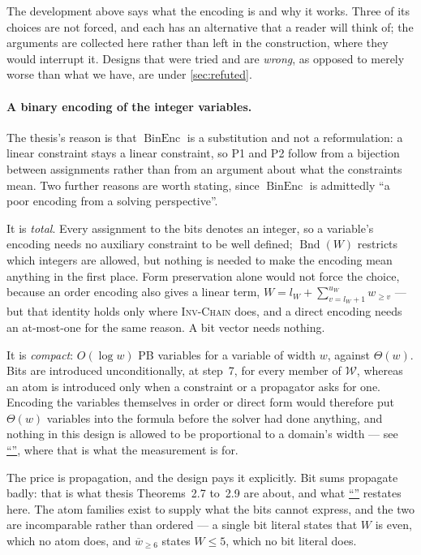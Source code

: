 \documentclass[11pt,a4paper]{article}
\theoremstyle{plain}
\theoremstyle{definition}
\theoremstyle{remark}
\newcommand{\fname}[1]{\ensuremath{\operatorname{#1}}}
\newcommand{\BinEnc}{\fname{BinEnc}}
\newcommand{\Bnd}{\fname{Bnd}}
\newcommand{\atge}[2]{#1_{\geq #2}}
\newcommand{\natge}[2]{\overline{#1}_{\geq #2}}
\newcommand{\inv}[1]{\textnormal{\textsc{Inv-#1}}}
\newcommand{\nsec}[1]{\hyperref[#1]{``\nameref*{#1}''}}
\newcommand{\invChain}{\inv{Chain}}
\begin{document}
The development above says what the encoding is and why it works.  Three of its
choices are not forced, and each has an alternative that a reader will think of;
the arguments are collected here rather than left in the construction, where they
would interrupt it.  Designs that were tried and are \emph{wrong}, as opposed to
merely worse than what we have, are under \cref{sec:refuted}.

\paragraph{A binary encoding of the integer variables.}
The thesis's reason is that $\BinEnc$ is a substitution and not a reformulation:
a linear constraint stays a linear constraint, so P1 and P2 follow from a
bijection between assignments rather than from an argument about what the
constraints mean.  Two further reasons are worth stating, since $\BinEnc$ is
admittedly ``a poor encoding from a solving perspective''.

It is \emph{total}.  Every assignment to the bits denotes an integer, so a
variable's encoding needs no auxiliary constraint to be well defined; $\Bnd(W)$
restricts which integers are allowed, but nothing is needed to make the encoding
mean anything in the first place.  Form preservation alone would not force the
choice, because an order encoding also gives a linear term,
$W = l_W + \sum_{v=l_W+1}^{u_W}\atge{w}{v}$ --- but that identity holds only
where \invChain{} does, and a direct encoding needs an at-most-one for the same
reason.  A bit vector needs nothing.

It is \emph{compact}: $O(\log w)$ PB variables for a variable of width $w$,
against $\Theta(w)$.  Bits are introduced unconditionally, at step~7, for every
member of $\mathcal W$, whereas an atom is introduced only when a constraint or a
propagator asks for one.  Encoding the variables themselves in order or direct
form would therefore put $\Theta(w)$ variables into the formula before the solver
had done anything, and nothing in this design is allowed to be proportional to a
domain's width --- see \nsec{sec:cost}, where that is what the measurement is
for.

The price is propagation, and the design pays it explicitly.  Bit sums propagate
badly: that is what thesis Theorems~2.7 to~2.9 are about, and what
\nsec{sec:notprovided} restates here.  The atom families exist to supply what the
bits cannot express, and the two are incomparable rather than ordered --- a
single bit literal states that $W$ is even, which no atom does, and
$\natge{w}{6}$ states $W\leq 5$, which no bit literal does.
\end{document}
